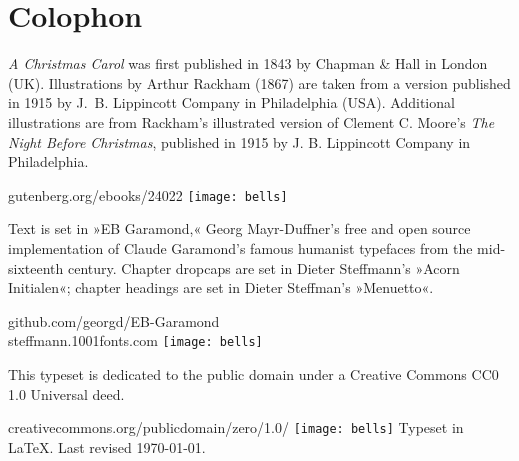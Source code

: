 \documentclass[
paper=5.5in:8.5in,
]{scrbook} %
\begin{document}
\chapter*{Colophon}
\vfill
\centering
\begin{minipage}{\textwidth}
\textit{A Christmas Carol} was first published in 1843 by Chapman \& Hall in London (UK). Illustrations by Arthur Rackham (1867) are taken from a version published in 1915 by J.~B. Lippincott Company in Philadelphia (USA). Additional illustrations are from Rackham's illustrated version of Clement C. Moore's \textit{The Night Before Christmas}, published in 1915 by J. B. Lippincott Company in Philadelphia.
\end{minipage}
\vfill
gutenberg.org/ebooks/24022
\vfill
\texttt{[image: bells]}
\vfill
\begin{minipage}{\textwidth}
Text is set in »EB Garamond,« Georg Mayr-Duffner's free and open source implementation of Claude Garamond’s famous humanist typefaces from the mid-sixteenth century. Chapter dropcaps are set in Dieter Steffmann's »Acorn Initialen«; chapter headings are set in Dieter Steffman's »Menuetto«.
\end{minipage}
\vfill
github.com/georgd/EB-Garamond
\\steffmann.1001fonts.com
\vfill
\texttt{[image: bells]}
\vfill
\begin{minipage}{\textwidth}
This typeset is dedicated to the public domain under a Creative Commons CC0 1.0 Universal deed.
\end{minipage}
\vfill
creativecommons.org/publicdomain/zero/1.0/
\vfill
\texttt{[image: bells]}
\vfill
Typeset in \LaTeX{}. Last revised \today.
\thispagestyle{empty}
\end{document}

